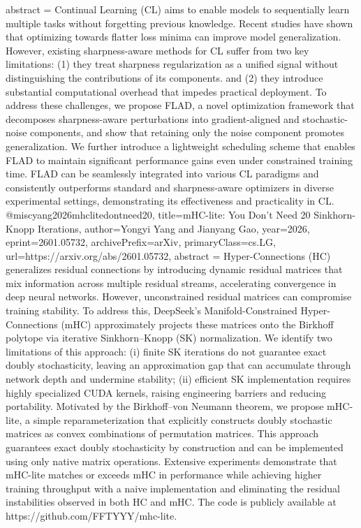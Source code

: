 {      abstract = {Continual Learning (CL) aims to enable models to sequentially learn multiple tasks without forgetting previous knowledge. Recent studies have shown that optimizing towards flatter loss minima can improve model generalization. However, existing sharpness-aware methods for CL suffer from two key limitations: (1) they treat sharpness regularization as a unified signal without distinguishing the contributions of its components. and (2) they introduce substantial computational overhead that impedes practical deployment. To address these challenges, we propose FLAD, a novel optimization framework that decomposes sharpness-aware perturbations into gradient-aligned and stochastic-noise components, and show that retaining only the noise component promotes generalization. We further introduce a lightweight scheduling scheme that enables FLAD to maintain significant performance gains even under constrained training time. FLAD can be seamlessly integrated into various CL paradigms and consistently outperforms standard and sharpness-aware optimizers in diverse experimental settings, demonstrating its effectiveness and practicality in CL.}
}@misc{yang2026mhclitedontneed20,
      title={mHC-lite: You Don't Need 20 Sinkhorn-Knopp Iterations}, 
      author={Yongyi Yang and Jianyang Gao},
      year={2026},
      eprint={2601.05732},
      archivePrefix={arXiv},
      primaryClass={cs.LG},
      url={https://arxiv.org/abs/2601.05732},
      abstract = {Hyper-Connections (HC) generalizes residual connections by introducing dynamic residual matrices that mix information across multiple residual streams, accelerating convergence in deep neural networks. However, unconstrained residual matrices can compromise training stability. To address this, DeepSeek's Manifold-Constrained Hyper-Connections (mHC) approximately projects these matrices onto the Birkhoff polytope via iterative Sinkhorn--Knopp (SK) normalization. We identify two limitations of this approach: (i) finite SK iterations do not guarantee exact doubly stochasticity, leaving an approximation gap that can accumulate through network depth and undermine stability; (ii) efficient SK implementation requires highly specialized CUDA kernels, raising engineering barriers and reducing portability. Motivated by the Birkhoff--von Neumann theorem, we propose mHC-lite, a simple reparameterization that explicitly constructs doubly stochastic matrices as convex combinations of permutation matrices. This approach guarantees exact doubly stochasticity by construction and can be implemented using only native matrix operations. Extensive experiments demonstrate that mHC-lite matches or exceeds mHC in performance while achieving higher training throughput with a naive implementation and eliminating the residual instabilities observed in both HC and mHC. The code is publicly available at https://github.com/FFTYYY/mhc-lite.}
}
